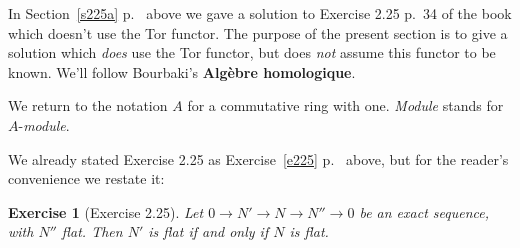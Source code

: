 \documentclass[parskip=half,fontsize=12pt]{scrartcl}%
\newtheorem{exo}[thm]{Exercise}
\begin{document}
In Section~\ref{s225a} p.~\pageref{s225a} above we gave a solution to Exercise 2.25 p.~34 of the book which doesn't use the Tor functor. The purpose of the present section is to give a solution which \emph{does} use the Tor functor, but does \emph{not} assume this functor to be known. We'll follow Bourbaki's \textbf{Algèbre homologique}.

We return to the notation $A$ for a commutative ring with one. \emph{Module} stands for $A$-\emph{module}. 

We already stated Exercise 2.25 as Exercise~\ref{e225} p.~\pageref{e225} above, but for the reader's convenience we restate it:

\begin{exo}[Exercise 2.25]\label{e225b}
Let $0\to N'\to N\to N''\to0$ be an exact sequence, with $N''$ flat. Then $N'$ is flat if and only if $N$ is flat.
\end{exo}

\end{document}
